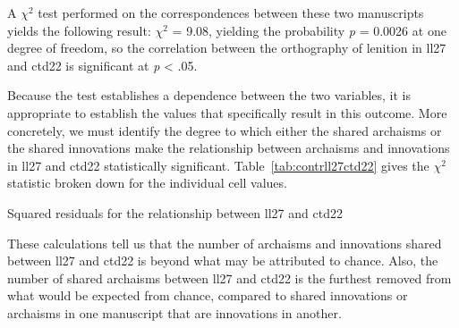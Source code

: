 
A \(\chi^2\) test performed on the correspondences between these two manuscripts yields the following result: \(\chi^2\) = 9.08, yielding the probability \emph{p} = 0.0026 at one degree of freedom, so the correlation between the orthography of lenition in \gls{ll27} and \gls{ctd22} is  significant at \textit{p} < .05.

Because the test establishes a dependence between the two variables, it is appropriate to establish the values that specifically result in  this outcome. More concretely, we must identify the degree to which either the shared archaisms or the shared innovations  make the relationship between archaisms and innovations in \gls{ll27} and \gls{ctd22} statistically significant. Table~\ref{tab:contrll27ctd22} gives the \(\chi^2\) statistic broken down for the individual cell values.

\begin{table}[h]
  \centering
  \caption{Squared residuals for the relationship between \acrshort{ll27} and \acrshort{ctd22}}
  \label{tab:contrll27ctd22}
  
\end{table}

These calculations tell us that the number of archaisms and innovations shared between \gls{ll27} and \gls{ctd22} is beyond what may be attributed to chance. Also, the number of shared archaisms between \gls{ll27} and \gls{ctd22} is the furthest removed from what would be expected from chance, compared to shared innovations or archaisms in one manuscript that are innovations in another.


